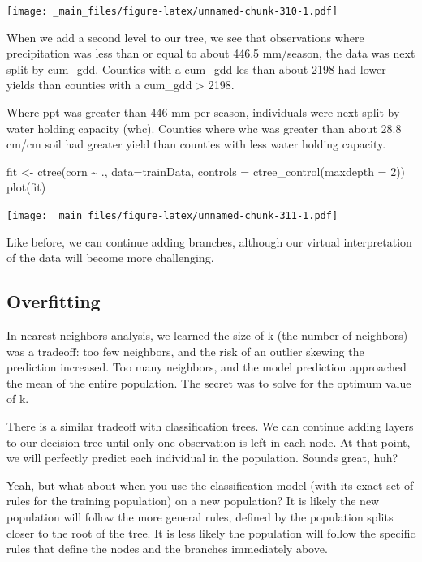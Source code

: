 \documentclass[
]{book}
\newenvironment{Shaded}{\begin{snugshade}}{\end{snugshade}}
\newcommand{\AttributeTok}[1]{\textcolor[rgb]{0.77,0.63,0.00}{#1}}
\newcommand{\DecValTok}[1]{\textcolor[rgb]{0.00,0.00,0.81}{#1}}
\newcommand{\FunctionTok}[1]{\textcolor[rgb]{0.00,0.00,0.00}{#1}}
\newcommand{\NormalTok}[1]{#1}
\newcommand{\OtherTok}[1]{\textcolor[rgb]{0.56,0.35,0.01}{#1}}
\newcommand{\SpecialCharTok}[1]{\textcolor[rgb]{0.00,0.00,0.00}{#1}}
\begin{document}
\texttt{[image: \_main\_files/figure-latex/unnamed-chunk-310-1.pdf]}

When we add a second level to our tree, we see that observations where precipitation was less than or equal to about 446.5 mm/season, the data was next split by cum\_gdd. Counties with a cum\_gdd les than about 2198 had lower yields than counties with a cum\_gdd \textgreater{} 2198.

Where ppt was greater than 446 mm per season, individuals were next split by water holding capacity (whc). Counties where whc was greater than about 28.8 cm/cm soil had greater yield than counties with less water holding capacity.

\begin{Shaded}
\begin{Highlighting}[]
\NormalTok{fit }\OtherTok{\textless{}{-}} \FunctionTok{ctree}\NormalTok{(corn }\SpecialCharTok{\textasciitilde{}}\NormalTok{ ., }\AttributeTok{data=}\NormalTok{trainData,}
             \AttributeTok{controls =} \FunctionTok{ctree\_control}\NormalTok{(}\AttributeTok{maxdepth =} \DecValTok{2}\NormalTok{))}
\FunctionTok{plot}\NormalTok{(fit)}
\end{Highlighting}
\end{Shaded}

\texttt{[image: \_main\_files/figure-latex/unnamed-chunk-311-1.pdf]}

Like before, we can continue adding branches, although our virtual interpretation of the data will become more challenging.

\hypertarget{overfitting-1}{%
\subsection{Overfitting}\label{overfitting-1}}

In nearest-neighbors analysis, we learned the size of k (the number of neighbors) was a tradeoff: too few neighbors, and the risk of an outlier skewing the prediction increased. Too many neighbors, and the model prediction approached the mean of the entire population. The secret was to solve for the optimum value of k.

There is a similar tradeoff with classification trees. We can continue adding layers to our decision tree until only one observation is left in each node. At that point, we will perfectly predict each individual in the population. Sounds great, huh?

Yeah, but what about when you use the classification model (with its exact set of rules for the training population) on a new population? It is likely the new population will follow the more general rules, defined by the population splits closer to the root of the tree. It is less likely the population will follow the specific rules that define the nodes and the branches immediately above.
\end{document}
